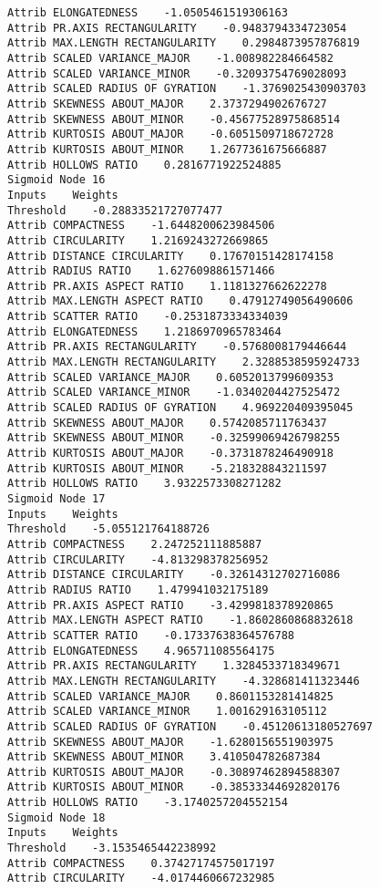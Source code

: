 \documentclass[
	article,			%
	11pt,				%
	oneside,			%
	a4paper,			%
	english,			%
	brazil,				%
	sumario=tradicional
	]{abntex2}
\begin{document}
\begin{lstlisting}
Attrib ELONGATEDNESS    -1.0505461519306163
Attrib PR.AXIS RECTANGULARITY    -0.9483794334723054
Attrib MAX.LENGTH RECTANGULARITY    0.2984873957876819
Attrib SCALED VARIANCE_MAJOR    -1.008982284664582
Attrib SCALED VARIANCE_MINOR    -0.32093754769028093
Attrib SCALED RADIUS OF GYRATION    -1.3769025430903703
Attrib SKEWNESS ABOUT_MAJOR    2.3737294902676727
Attrib SKEWNESS ABOUT_MINOR    -0.45677528975868514
Attrib KURTOSIS ABOUT_MAJOR    -0.6051509718672728
Attrib KURTOSIS ABOUT_MINOR    1.2677361675666887
Attrib HOLLOWS RATIO    0.2816771922524885
Sigmoid Node 16
Inputs    Weights
Threshold    -0.28833521727077477
Attrib COMPACTNESS    -1.6448200623984506
Attrib CIRCULARITY    1.2169243272669865
Attrib DISTANCE CIRCULARITY    0.17670151428174158
Attrib RADIUS RATIO    1.6276098861571466
Attrib PR.AXIS ASPECT RATIO    1.1181327662622278
Attrib MAX.LENGTH ASPECT RATIO    0.47912749056490606
Attrib SCATTER RATIO    -0.2531873334334039
Attrib ELONGATEDNESS    1.2186970965783464
Attrib PR.AXIS RECTANGULARITY    -0.5768008179446644
Attrib MAX.LENGTH RECTANGULARITY    2.3288538595924733
Attrib SCALED VARIANCE_MAJOR    0.6052013799609353
Attrib SCALED VARIANCE_MINOR    -1.0340204427525472
Attrib SCALED RADIUS OF GYRATION    4.969220409395045
Attrib SKEWNESS ABOUT_MAJOR    0.5742085711763437
Attrib SKEWNESS ABOUT_MINOR    -0.32599069426798255
Attrib KURTOSIS ABOUT_MAJOR    -0.3731878246490918
Attrib KURTOSIS ABOUT_MINOR    -5.218328843211597
Attrib HOLLOWS RATIO    3.9322573308271282
Sigmoid Node 17
Inputs    Weights
Threshold    -5.055121764188726
Attrib COMPACTNESS    2.247252111885887
Attrib CIRCULARITY    -4.813298378256952
Attrib DISTANCE CIRCULARITY    -0.32614312702716086
Attrib RADIUS RATIO    1.479941032175189
Attrib PR.AXIS ASPECT RATIO    -3.4299818378920865
Attrib MAX.LENGTH ASPECT RATIO    -1.8602860868832618
Attrib SCATTER RATIO    -0.17337638364576788
Attrib ELONGATEDNESS    4.965711085564175
Attrib PR.AXIS RECTANGULARITY    1.3284533718349671
Attrib MAX.LENGTH RECTANGULARITY    -4.328681411323446
Attrib SCALED VARIANCE_MAJOR    0.8601153281414825
Attrib SCALED VARIANCE_MINOR    1.001629163105112
Attrib SCALED RADIUS OF GYRATION    -0.45120613180527697
Attrib SKEWNESS ABOUT_MAJOR    -1.6280156551903975
Attrib SKEWNESS ABOUT_MINOR    3.410504782687384
Attrib KURTOSIS ABOUT_MAJOR    -0.30897462894588307
Attrib KURTOSIS ABOUT_MINOR    -0.38533344692820176
Attrib HOLLOWS RATIO    -3.1740257204552154
Sigmoid Node 18
Inputs    Weights
Threshold    -3.1535465442238992
Attrib COMPACTNESS    0.37427174575017197
Attrib CIRCULARITY    -4.0174460667232985

\end{lstlisting}
\end{document}
